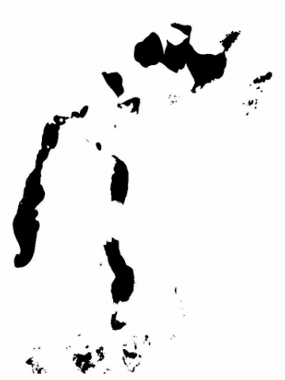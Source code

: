 \documentclass[12pt,a4paper]{article}
\begin{document}
\begin{figure}
\begin{subfigure}[b]{0.19\textwidth}
        \includegraphics[width=\textwidth]{../img/2015w.jpg}
    \end{subfigure}
    \begin{subfigure}[b]{0.19\textwidth}
        \centering

\end{subfigure}
\end{figure}
\end{document}
